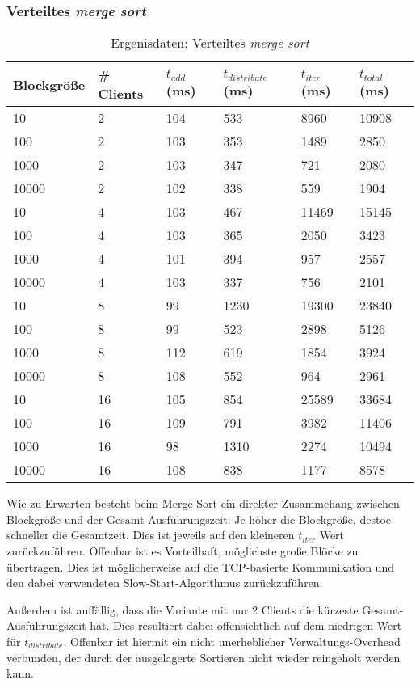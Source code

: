 \documentclass[fontsize=12pt,a4paper,headinclude=no,headings=small]{scrartcl}
\begin{document}
\subsubsection{Verteiltes \textit{merge sort}}
\begin{table}[htp]
\begin{tabularx}{\textwidth}{ |X|X|X|X|X|X| }
\hline
Blockgröße & \# Clients & $t_{add}$ (ms) & $t_{distribute}$ (ms) & $t_{iter}$ (ms) & $t_{total}$ (ms) \\
\hline
10 & 2 & 104 & 533 & 8960 & 10908 \\
100 & 2 & 103 & 353 & 1489 & 2850 \\
1000 & 2 & 103 & 347 & 721 & 2080 \\
10000 & 2 & 102 & 338 & 559 & 1904 \\
\hline
10 & 4 & 103 & 467 & 11469 & 15145 \\
100 & 4 & 103 & 365 & 2050 & 3423 \\
1000 & 4 & 101 & 394 & 957 & 2557 \\
10000 & 4 & 103 & 337 & 756 & 2101 \\
\hline
10 & 8 & 99 & 1230 & 19300 & 23840 \\
100 & 8 & 99 & 523 & 2898 & 5126 \\
1000 & 8 & 112 & 619 & 1854 & 3924 \\
10000 & 8 & 108 & 552 & 964 & 2961 \\
\hline
10 & 16 & 105 & 854 & 25589 & 33684 \\
100 & 16 & 109 & 791 & 3982 & 11406 \\
1000 & 16 & 98 & 1310 & 2274 & 10494 \\
10000 & 16 & 108 & 838 & 1177 & 8578 \\
\hline
\end{tabularx}
\caption{Ergenisdaten: Verteiltes \textit{merge sort}}
\end{table}
Wie zu Erwarten besteht beim Merge-Sort ein direkter Zusammehang zwischen Blockgröße und der Gesamt-Ausführungszeit: Je höher die Blockgröße, destoe schneller die Gesamtzeit. Dies ist jeweils auf den kleineren $t_{iter}$ Wert zurückzuführen. Offenbar ist es Vorteilhaft, möglichste große Blöcke zu übertragen. Dies ist möglicherweise auf die TCP-basierte Kommunikation und den dabei verwendeten Slow-Start-Algorithmus zurückzuführen.
 
Außerdem ist auffällig, dass die Variante mit nur 2 Clients die kürzeste Gesamt-Ausführungszeit hat. Dies resultiert dabei offensichtlich auf dem niedrigen Wert für $t_{distribute}$. Offenbar ist hiermit ein nicht unerheblicher Verwaltungs-Overhead verbunden, der durch der ausgelagerte Sortieren nicht wieder reingeholt werden kann.
\end{document}
